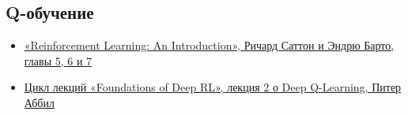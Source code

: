 \documentclass[11pt,a4paper]{article}
\begin{document}
\subsection{Q-обучение}\label{q-learning}

\begin{itemize}
\tightlist
\item
  \href{http://incompleteideas.net/book/RLbook2020.pdf}{«Reinforcement Learning: An Introduction», Ричард Саттон и Эндрю Барто, главы 5, 6 и 7}
\item
  \href{https://youtu.be/Psrhxy88zww}{Цикл лекций «Foundations of Deep RL», лекция 2 о Deep Q-Learning, Питер Аббил}
\end{itemize}
\end{document}
